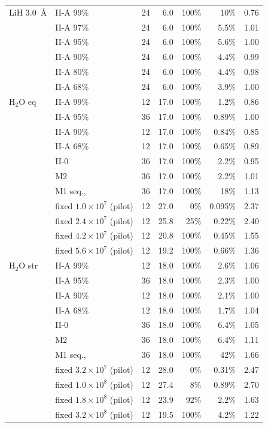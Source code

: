\begin{table}[!htb]
{\begin{tabular}{llrrrrr}
\midrule
LiH 3.0~\AA & II-A 99\% & 24 & 6.0 & 100\% & 10\% & 0.76 \\
 & II-A 97\% & 24 & 6.0 & 100\% & 5.5\% & 1.01 \\
 & II-A 95\% & 24 & 6.0 & 100\% & 5.6\% & 1.00 \\
 & II-A 90\% & 24 & 6.0 & 100\% & 4.4\% & 0.99 \\
 & II-A 80\% & 24 & 6.0 & 100\% & 4.4\% & 0.98 \\
 & II-A 68\% & 24 & 6.0 & 100\% & 3.9\% & 1.00 \\
\midrule
H$_2$O eq & II-A 99\% & 12 & 17.0 & 100\% & 1.2\% & 0.86 \\
 & II-A 95\% & 36 & 17.0 & 100\% & 0.89\% & 1.00 \\
 & II-A 90\% & 12 & 17.0 & 100\% & 0.84\% & 0.85 \\
 & II-A 68\% & 12 & 17.0 & 100\% & 0.65\% & 0.89 \\
 & II-0 & 36 & 17.0 & 100\% & 2.2\% & 0.95 \\
 & M2 & 36 & 17.0 & 100\% & 2.2\% & 1.01 \\
 & M1 seq., & 36 & 17.0 & 100\% & 18\% & 1.13 \\
 & fixed $1.0\times10^{7}$ (pilot) & 12 & 27.0 & 0\% & 0.095\% & 2.37 \\
 & fixed $2.4\times10^{7}$ (pilot) & 12 & 25.8 & 25\% & 0.22\% & 2.40 \\
 & fixed $4.2\times10^{7}$ (pilot) & 12 & 20.8 & 100\% & 0.45\% & 1.55 \\
 & fixed $5.6\times10^{7}$ (pilot) & 12 & 19.2 & 100\% & 0.66\% & 1.36 \\
\midrule
H$_2$O str & II-A 99\% & 12 & 18.0 & 100\% & 2.6\% & 1.06 \\
 & II-A 95\% & 36 & 18.0 & 100\% & 2.3\% & 1.00 \\
 & II-A 90\% & 12 & 18.0 & 100\% & 2.1\% & 1.00 \\
 & II-A 68\% & 12 & 18.0 & 100\% & 1.7\% & 1.04 \\
 & II-0 & 36 & 18.0 & 100\% & 6.4\% & 1.05 \\
 & M2 & 36 & 18.0 & 100\% & 6.4\% & 1.11 \\
 & M1 seq., & 36 & 18.0 & 100\% & 42\% & 1.66 \\
 & fixed $3.2\times10^{7}$ (pilot) & 12 & 28.0 & 0\% & 0.31\% & 2.47 \\
 & fixed $1.0\times10^{8}$ (pilot) & 12 & 27.4 & 8\% & 0.89\% & 2.70 \\
 & fixed $1.8\times10^{8}$ (pilot) & 12 & 23.9 & 92\% & 2.2\% & 1.63 \\
 & fixed $3.2\times10^{8}$ (pilot) & 12 & 19.5 & 100\% & 4.2\% & 1.22 \\
\bottomrule
\end{tabular}}
\end{table}
